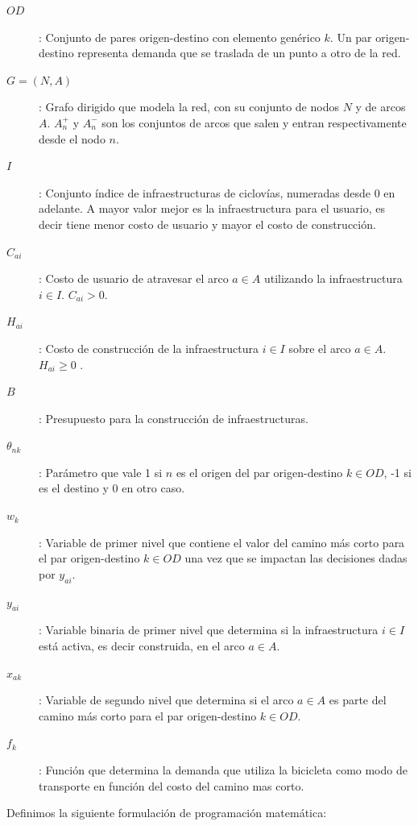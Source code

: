 \documentclass{article}
\begin{document}
  \begin{description}
    \item[$OD$]: Conjunto de pares origen-destino con elemento genérico $k$. Un par origen-destino representa demanda que se traslada de un punto a otro de la red.
    \item[$G=(N,A)$]: Grafo dirigido que modela la red, con su conjunto de nodos $N$ y de arcos $A$. $A_n^+$ y $A_n^-$ son los conjuntos de arcos que salen y entran respectivamente desde el nodo $n$.
    \item[$I$]: Conjunto índice de infraestructuras de ciclovías, numeradas desde $0$ en adelante. A mayor valor mejor es la infraestructura para el usuario, es decir tiene menor costo de usuario y mayor el costo de construcción.
    \item[$C_{ai}$]: Costo de usuario de atravesar el arco $a \in A$ utilizando la infraestructura $i \in I$. $C_{ai} > 0$.
    \item[$H_{ai}$]: Costo de construcción de la infraestructura $i \in I$ sobre el arco $a \in A$. $H_{ai} \geq 0$ .
    \item[$B$]: Presupuesto para la construcción de infraestructuras.
    \item[$\theta_{nk}$]: Parámetro que vale 1 si $n$ es el origen del par origen-destino $k \in OD$, -1 si es el destino y 0 en otro caso.
    \item[$w_k$]: Variable de primer nivel que contiene el valor del camino más corto para el par origen-destino $k \in OD$ una vez que se impactan las decisiones dadas por $y_{ai}$.
    \item[$y_{ai}$]: Variable binaria de primer nivel que determina si la infraestructura $i \in I$ está activa, es decir construida, en el arco $a \in A$.
    \item[$x_{ak}$]: Variable de segundo nivel que determina si el arco $a \in A$ es parte del camino más corto para el par origen-destino $k \in OD$.
    \item[$f_k$]: Función que determina la demanda que utiliza la bicicleta como modo de transporte en función del costo del camino mas corto.
  \end{description}

  Definimos la siguiente formulación de programación matemática:
\end{document}
